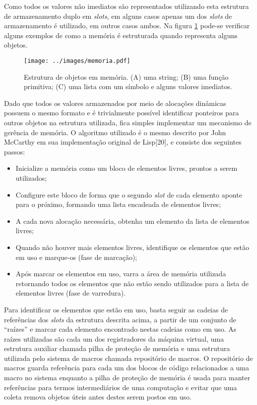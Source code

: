 Como todos os valores não imediatos são representados utilizando esta
estrutura de armazenamento duplo em \textit{slots}, em alguns casos apenas um dos \textit{slots}
de armazenamento é utilizado, em outros casos ambos. Na figura \ref{fig:memoria}
pode-se verificar alguns exemplos de como a memória é estruturada quando
representa alguns objetos.

\begin{figure}[h!]
\centering
\texttt{[image: ../images/memoria.pdf]}
\caption{Estrutura de objetos em memória. (A) uma string; (B) uma função
         primitiva; (C) uma lista com um símbolo e alguns valores imediatos.}
\label{fig:memoria}
\end{figure}

Dado que todos os valores armazenados por meio de alocações dinâmicas possuem o
mesmo formato e é trivialmente possível identificar ponteiros para outros
objetos na estrutura utilizada, fica simples implementar um mecanismo de
gerência de memória. O algoritmo utilizado é o mesmo descrito por John McCarthy
em sua implementação original de Lisp[20], e consiste dos seguintes passos:

\begin{itemize}

\item Inicialize a memória como um bloco de elementos livres, prontos a serem
utilizados;
 
\item Configure este bloco de forma que o segundo \textit{slot} de cada elemento aponte
para o próximo, formando uma lista encadeada de elementos livres;
 
\item A cada nova alocação necessária, obtenha um elemento da lista de
elementos livres;
 
\item Quando não houver mais elementos livres, identifique os elementos que
estão em uso e marque-os (fase de marcação);
 
\item Após marcar os elementos em uso, varra a área de memória utilizada
retornando todos os elementos que não estão sendo utilizados para a lista de
elementos livres (fase de varredura).

\end{itemize}

Para identificar os elementos que estão em uso, basta seguir as cadeias de
referências dos \textit{slots} da estrutura descrita acima, a partir de um
conjunto de ``raízes'' e marcar cada elemento encontrado nestas cadeias como em
uso. As raízes utilizadas são cada um dos registradores da máquina virtual, uma
estrutura auxiliar chamada pilha de proteção de memória e uma estrutura
utilizada pelo sistema de macros chamada repositório de macros. O repositório
de macros guarda referência para cada um dos blocos de código relacionados a
uma macro no sistema enquanto a pilha de proteção de memória é usada para
manter referências para termos intermediários de uma computação e evitar que
uma coleta remova objetos úteis antes destes serem postos em uso.

